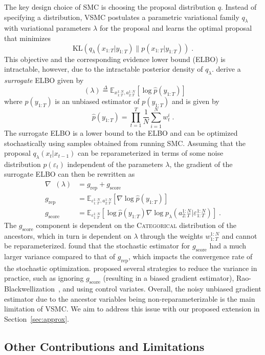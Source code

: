 \documentclass[12pt]{article}
\newcommand{\vsmc}{\textsc{VSMC}\xspace}
\newcommand{\smc}{\textsc{SMC}\xspace}
\newcommand{\elbo}{\textsc{ELBO}\xspace}
\newcommand{\categorical}{\textsc{Categorical}\xspace}
\newcommand{\grep}{g_{\mathrm{rep}}}
\newcommand{\gscore}{g_{\mathrm{score}}}
\DeclareMathOperator{\surrogate}{\tilde{\mathcal{L}}}
\begin{document}
The key design choice of \smc is choosing the proposal distribution $q$. Instead of specifying a distribution, \vsmc postulates a parametric variational family $q_\lambda$ with variational parameters $\lambda$ for the proposal and learns the optimal proposal that minimizes
\[
\mathrm{KL}\left(q_\lambda(x_{1:T}|y_{1:T})\| p(x_{1:T}|y_{1:T})\right) \;.
\]
This objective and the corresponding evidence lower bound (\elbo) is intractable, however, due to the intractable posterior density of $q_\lambda$. \textcite{Naesseth:2018} derive a \textit{surrogate} \elbo given by
\[
\surrogate(\lambda) \overset{\Delta}{=} \mathbb{E}_{x_{1:T}^{1:N},a_{2:T}^{1:N}}\left[\log \hat{p}(y_{1:T})\right]
\]
where $\hat{p}(y_{1:T})$ is an unbiased estimator of $p(y_{1:T})$ and is given by
\[
\hat{p}(y_{1:T}) = \prod_{t=1}^T\frac{1}{N}\sum_{i=1}^Nw_t^i \;.
\]
The surrogate \elbo is a lower bound to the \elbo and can be optimized stochastically using samples obtained from running \smc. Assuming that the proposal $q_\lambda(x_t|x_{t-1})$ can be reparameterized in terms of some noise distribution $p(\varepsilon_t)$ independent of the parameters $\lambda$, the gradient of the surrogate \elbo can then be rewritten as
\begin{align*}
\nabla\surrogate(\lambda) &= \grep + \gscore \\
\grep &= \mathbb{E}_{\varepsilon_{1:T}^{1:N},a_{2:T}^{1:N}}\left[\nabla\log\hat{p}(y_{1:T})\right] \\
\gscore &= \mathbb{E}_{\varepsilon_{1:T}^{1:N}}\left[\log\hat{p}(y_{1:T})\nabla\log p_\lambda(a_{2:T}^{1:N}|\varepsilon_{1:T}^{1:N}) \right] \;.
\end{align*}
The $\gscore$ component is dependent on the \categorical distribution of the ancestors, which in turn is dependent on $\lambda$ through the weights $w_{1:T}^{1:N}$ and cannot be reparameterized. \textcite{Naesseth:2018} found that the stochastic estimator for $\gscore$ had a much larger variance compared to that of $\grep$, which impacts the convergence rate of the stochastic optimization. \textcite{Naesseth:2018} proposed several strategies to reduce the variance in practice, such as ignoring $\gscore$ (resulting in a biased gradient estimator), Rao-Blackwellization~\parencite{Robert:2021}, and using control variates. Overall, the noisy unbiased gradient estimator due to the ancestor variables being non-reparameterizable is the main limitation of \vsmc. We aim to address this issue with our proposed extension in Section~\ref{sec:approx}.

\subsection{Other Contributions and Limitations}
\end{document}
